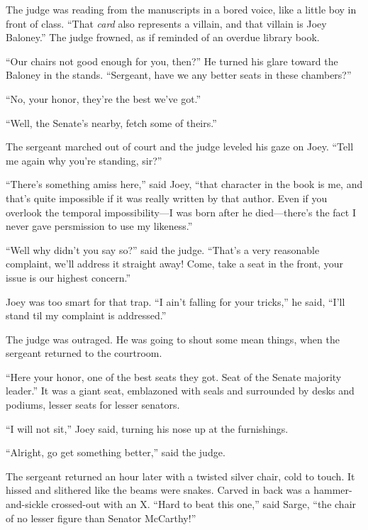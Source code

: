 \documentclass[oneside]{book}
\begin{document}
The judge was reading from the manuscripts in a bored voice,
like a little boy in front of class.
``That \emph{card} also represents a villain,
and that villain is Joey Baloney.''  
The judge frowned,
as if reminded of an overdue library book.

``Our chairs not good enough for you, then?''  He turned his glare toward
the Baloney in the stands.
``Sergeant, have we any better seats in these chambers?''

``No, your honor, they're the best we've got.''

``Well, the Senate's nearby, fetch some of theirs.''

The sergeant marched out of court and the judge leveled his gaze on Joey.
``Tell me again why you're standing, sir?''

``There's something amiss here,'' said Joey, ``that character in the book is me,
and that's quite impossible if it was really written by that author.
Even if you overlook the temporal impossibility---I was born after he
died---there's the fact I never gave persmission to use my likeness.''

``Well why didn't you say so?'' said the judge.  ``That's a very reasonable
complaint, we'll address it straight away!  Come, take a seat in the front,
your issue is our highest concern.''

Joey was too smart for that trap.  ``I ain't falling for your tricks,''
he said, ``I'll stand til my complaint is addressed.''

The judge was outraged.  He was going to shout some
mean things, when the sergeant returned to the courtroom.

``Here your honor, one of the best seats they got.  Seat of the Senate majority
leader.''  It was a giant seat, emblazoned with seals and surrounded by
desks and podiums, lesser seats for lesser senators.

``I will not sit,'' Joey said, turning his nose up at the furnishings.

``Alright, go get something better,'' said the judge.

The sergeant returned an hour later with a twisted silver chair, cold
to touch.  It hissed and slithered
like the beams were snakes.  Carved in back was a
hammer-and-sickle crossed-out with an X.  ``Hard to beat this one,'' said Sarge,
``the chair of no lesser figure than Senator McCarthy!''
\end{document}
